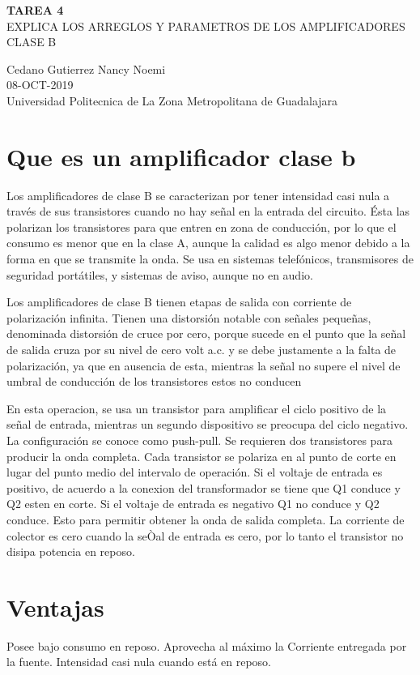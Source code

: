 \documentclass[11pt,a4paper]{article}
\begin{document}
\begin{center}
\textbf{TAREA 4}\\
EXPLICA LOS ARREGLOS Y PARAMETROS DE LOS AMPLIFICADORES CLASE B
\end{center}

\begin{center}
Cedano Gutierrez Nancy Noemi\\
08-OCT-2019\\
Universidad Politecnica de La Zona Metropolitana de Guadalajara
\end{center}


\section{Que es un amplificador clase b}
Los amplificadores de clase B se caracterizan por tener intensidad casi nula a través de sus transistores cuando no hay señal en la entrada del circuito. Ésta las polarizan los transistores para que entren en zona de conducción, por lo que el consumo es menor que en la clase A, aunque la calidad es algo menor debido a la forma en que se transmite la onda. Se usa en sistemas telefónicos, transmisores de seguridad portátiles, y sistemas de aviso, aunque no en audio.

Los amplificadores de clase B tienen etapas de salida con corriente de polarización infinita. Tienen una distorsión notable con señales pequeñas, denominada distorsión de cruce por cero, porque sucede en el punto que la señal de salida cruza por su nivel de cero volt a.c. y se debe justamente a la falta de polarización, ya que en ausencia de esta, mientras la señal no supere el nivel de umbral de conducción de los transistores estos no conducen

En esta operacion, se usa un transistor para amplificar el ciclo positivo de la señal de entrada, mientras un segundo dispositivo se preocupa del ciclo negativo.
La configuración se conoce como push-pull.
Se requieren dos transistores para producir la onda completa. Cada transistor se polariza en al punto de corte en lugar del punto medio del intervalo de operación. Si el voltaje de entrada es positivo, de acuerdo a la conexion del transformador se tiene que Q1 conduce y Q2 esten en corte. Si el voltaje de entrada es negativo Q1 no conduce y Q2 conduce. Esto para permitir obtener la onda de salida completa. La corriente de colector es cero cuando la seÒal de entrada es cero, por lo tanto el transistor no disipa potencia en reposo.

\section{Ventajas}
Posee bajo consumo en reposo.
Aprovecha al máximo la Corriente entregada por la fuente.
Intensidad casi nula cuando está en reposo.
\end{document}

